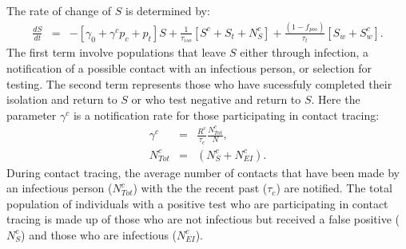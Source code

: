 \documentclass[notitlepage, superscriptaddress]{revtex4-2}
\begin{document}
The rate of change of $S$ is determined by:
\begin{eqnarray}
\label{E:dS}
\frac{dS}{dt} &=& - [\gamma_{0}  + \gamma^{c} p_{c} +p_{t}] S + \frac{1}{\tau_{iso}}[S^{c} + S_{t} + N^{c}_{S}] + \frac{(1-f_{pos})}{\tau_{t}}[S_{w} + S^{c}_{w}].
\end{eqnarray}
The first term involve populations that leave $S$ either through infection, a notification of a possible contact with an infectious person, or selection for testing. The second term represents those who have sucessfuly completed their isolation and return to $S$ or who test negative and return to $S$. Here the parameter $\gamma^{c}$ is a notification rate for those participating in contact tracing:
\begin{eqnarray}
\label{E:notificationrate}
\gamma^{c} &=& \frac{R^{c}}{\tau_{c}} \frac{N^{c}_{Tot} }{N}, \\
N^{c}_{Tot} &=& (N^{c}_{S} + N^{c}_{EI}).
\end{eqnarray}
During contact tracing, the average number of contacts that have been made by an infectious person ($N^{c}_{Tot}$) with the the recent past ($\tau_{c}$) are notified. The total population of individuals with a positive test who are participating in contact tracing is made up of those who are not infectious but received a false positive ($N^{c}_{S}$) and those who are infectious ($N^{c}_{EI}$). 
\end{document}
